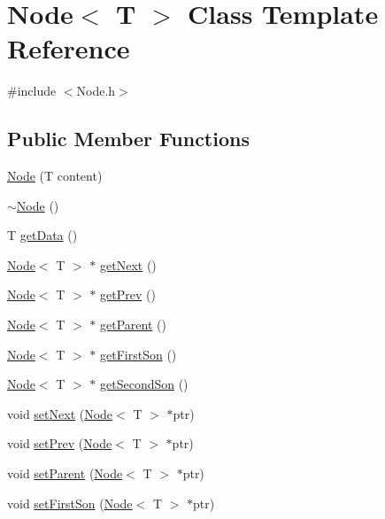 \hypertarget{class_node}{}\section{Node$<$ T $>$ Class Template Reference}
\label{class_node}


{\ttfamily \#include $<$Node.\+h$>$}

\subsection*{Public Member Functions}
\begin{DoxyCompactItemize}
\item 
\hyperlink{class_node_ae84949b503d6e739e444b034cb4901e9}{Node} (T content)
\item 
\hyperlink{class_node_ae923d0417581dd19784d55b901f0f7f0}{$\sim$\+Node} ()
\item 
T \hyperlink{class_node_a0c3315ee2e897e2a6e1c24aeca20aeb9}{get\+Data} ()
\item 
\hyperlink{class_node}{Node}$<$ T $>$ $\ast$ \hyperlink{class_node_afd985b504e37f4f8d7342f58e6035238}{get\+Next} ()
\item 
\hyperlink{class_node}{Node}$<$ T $>$ $\ast$ \hyperlink{class_node_aab8224dbd6cf2c4b6df7b2920c802b8b}{get\+Prev} ()
\item 
\hyperlink{class_node}{Node}$<$ T $>$ $\ast$ \hyperlink{class_node_a1fe843bd1fa3267bcb2e587e36b55bbc}{get\+Parent} ()
\item 
\hyperlink{class_node}{Node}$<$ T $>$ $\ast$ \hyperlink{class_node_af04828ea7fd689f97336e5d3cebe3281}{get\+First\+Son} ()
\item 
\hyperlink{class_node}{Node}$<$ T $>$ $\ast$ \hyperlink{class_node_a995ceb51ab17cfdff11c6d5183118433}{get\+Second\+Son} ()
\item 
void \hyperlink{class_node_a23ae860653821e5059ada68d53ed5188}{set\+Next} (\hyperlink{class_node}{Node}$<$ T $>$ $\ast$ptr)
\item 
void \hyperlink{class_node_adc7682109a39cd7d91452c92f97a9c19}{set\+Prev} (\hyperlink{class_node}{Node}$<$ T $>$ $\ast$ptr)
\item 
void \hyperlink{class_node_a61f5675b13f5b836ca21adbee67eb91e}{set\+Parent} (\hyperlink{class_node}{Node}$<$ T $>$ $\ast$ptr)
\item 
void \hyperlink{class_node_a71c193658bfa572da23f8f136f7ffa73}{set\+First\+Son} (\hyperlink{class_node}{Node}$<$ T $>$ $\ast$ptr)
\item 

\end{DoxyCompactItemize}
